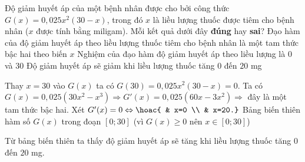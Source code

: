 \begin{ex}%
	Độ giảm huyết áp của một bệnh nhân được cho bởi công thức $G(x)=0{,}025x^2(30-x)$, trong đó $x$ là liều lượng thuốc được tiêm cho bệnh nhân ($x$ được tính bằng miligam). Mỗi kết quả dưới đây \textbf{đúng} hay \textbf{sai}?
	{\True Đạo hàm của độ giảm huyết áp theo liều lượng thuốc tiêm cho bệnh nhân là một tam thức bậc hai theo biến $x$}
	{Nghiệm của đạo hàm độ giảm huyết áp theo liều lượng là $0$ và $30$}
	{Độ giảm huyết áp sẽ giảm khi liều lượng thuốc tăng $0$ đến $20$ mg}
	\loigiai
	{ 
		\begin{itemchoice}
			\itemch Thay $x=30$ vào $G(x)$ ta có $G(30)=0{,}025x^2(30-x)=0$.
			\itemch Ta có $G(x)=0{,}025\left(30x^2-x^3\right) \Rightarrow G'(x)=0{,}025\left(60x-3x^2\right) \Rightarrow$ đây là một tam thức bậc hai.
			\itemch Xét $G'(x)=0 \Leftrightarrow \hoac{ & x=0 \\ & x=20.}$ 
			\itemch Bảng biến thiên hàm số $G(x)$ trong đoạn $[0;30]$ (vì $G(x)\ge 0$ nên $x\in [0;30]$)
			\begin{center}
			\end{center}
			Từ bảng biến thiên ta thấy độ giảm huyết áp sẽ tăng khi liều lượng thuốc tăng $0$ đến $20$ mg.
		\end{itemchoice}
	}
\end{ex}

